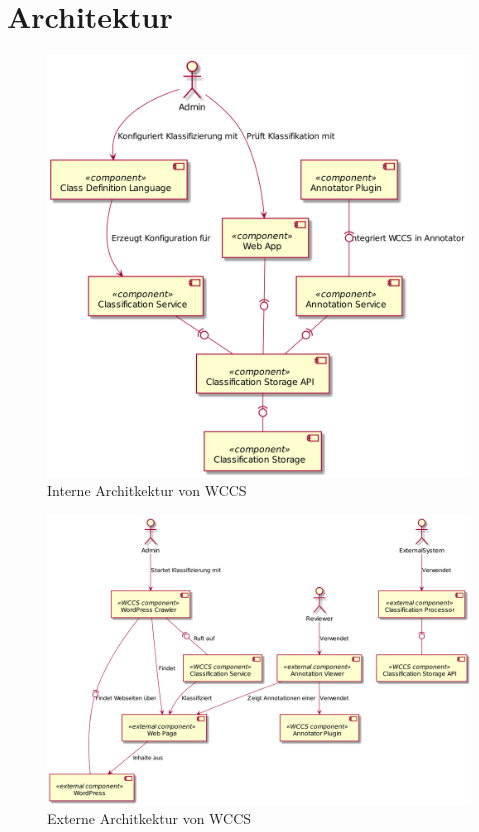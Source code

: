     \section{Architektur}
        \label{section:Architecture}
        \begin{figure}
            \centering
            \includegraphics[width=\textwidth]{../resources/architecture/wccs_internal_architecture.png}
            \caption{Interne Architkektur von WCCS}
            \label{image:wccsInternalArchitecture}
        \end{figure}

        \begin{figure}
            \centering
            \includegraphics[width=\textwidth]{../resources/architecture/external_architecture.png}
            \caption{Externe Architkektur von WCCS}
            \label{image:wccsExternalArchitecture}
        \end{figure}